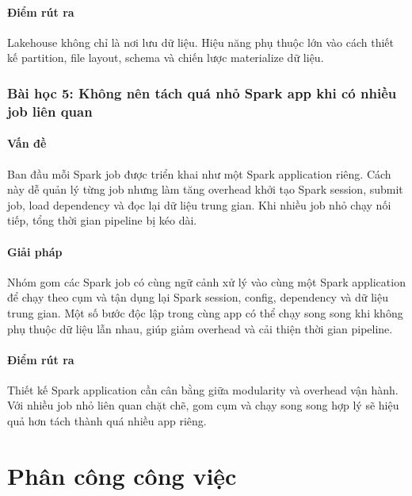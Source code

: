 \documentclass[12pt,a4paper]{article}
\begin{document}
\paragraph{Điểm rút ra}\label{diem-rut-ra-toi-uu-iceberg-table}

Lakehouse không chỉ là nơi lưu dữ liệu. Hiệu năng phụ thuộc lớn vào cách thiết kế partition, file layout, schema và chiến lược materialize dữ liệu.

\subsubsection{Bài học 5: Không nên tách quá nhỏ Spark app khi có nhiều job liên quan}\label{bai-hoc-5-khong-nen-tach-qua-nho-spark-app}

\paragraph{Vấn đề}\label{van-de-nhieu-spark-app}

Ban đầu mỗi Spark job được triển khai như một Spark application riêng. Cách này dễ quản lý từng job nhưng làm tăng overhead khởi tạo Spark session, submit job, load dependency và đọc lại dữ liệu trung gian. Khi nhiều job nhỏ chạy nối tiếp, tổng thời gian pipeline bị kéo dài.

\paragraph{Giải pháp}\label{giai-phap-gom-spark-job}

Nhóm gom các Spark job có cùng ngữ cảnh xử lý vào cùng một Spark application để chạy theo cụm và tận dụng lại Spark session, config, dependency và dữ liệu trung gian. Một số bước độc lập trong cùng app có thể chạy song song khi không phụ thuộc dữ liệu lẫn nhau, giúp giảm overhead và cải thiện thời gian pipeline.

\paragraph{Điểm rút ra}\label{diem-rut-ra-gom-spark-job}

Thiết kế Spark application cần cân bằng giữa modularity và overhead vận hành. Với nhiều job nhỏ liên quan chặt chẽ, gom cụm và chạy song song hợp lý sẽ hiệu quả hơn tách thành quá nhiều app riêng.
\newpage
\section{Phân công công việc}\label{phuxe2n-cuxf4ng-cuxf4ng-viux1ec7c}
\end{document}
